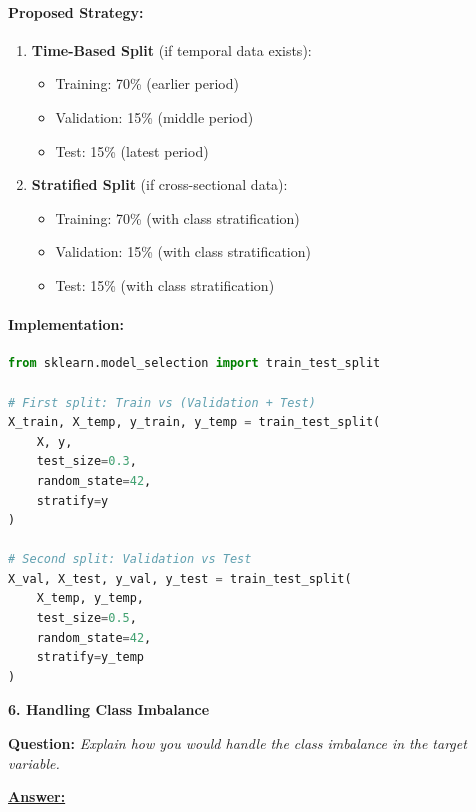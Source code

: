 \documentclass[11pt,a4paper]{article}
\newcommand{\questiontitle}[2]{%
    \vspace{0.4cm}%
    \noindent\textbf{\large\color{headerblue}#1. #2}\par\vspace{0.15cm}%
}
\newcommand{\qprompt}[1]{%
    \noindent\textbf{Question:} \textit{#1}\par\vspace{0.2cm}%
}
\newcommand{\answer}{\noindent\textbf{\underline{Answer:}}\par\vspace{0.15cm}}
\begin{document}
\paragraph{Proposed Strategy:}
\begin{enumerate}
    \item \textbf{Time-Based Split} (if temporal data exists):
    \begin{itemize}
        \item Training: 70\% (earlier period)
        \item Validation: 15\% (middle period)
        \item Test: 15\% (latest period)
    \end{itemize}
    \item \textbf{Stratified Split} (if cross-sectional data):
    \begin{itemize}
        \item Training: 70\% (with class stratification)
        \item Validation: 15\% (with class stratification)
        \item Test: 15\% (with class stratification)
    \end{itemize}
\end{enumerate}

\paragraph{Implementation:}
\begin{lstlisting}[language=Python]
from sklearn.model_selection import train_test_split

# First split: Train vs (Validation + Test)
X_train, X_temp, y_train, y_temp = train_test_split(
    X, y, 
    test_size=0.3, 
    random_state=42,
    stratify=y
)

# Second split: Validation vs Test
X_val, X_test, y_val, y_test = train_test_split(
    X_temp, y_temp,
    test_size=0.5,
    random_state=42,
    stratify=y_temp
)
\end{lstlisting}

\vspace{0.35cm}

\questiontitle{6}{Handling Class Imbalance}
\qprompt{Explain how you would handle the class imbalance in the target variable.}
\answer
\end{document}
